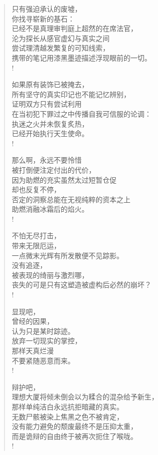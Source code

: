 \documentclass[UTF8, 12pt, a4paper]{ctexrep} %
\begin{document}
\begin{verse}

    只有强迫承认的废墟，\\
    你找寻崭新的基石：\\
    已经不是真理审判庭上超然的在席法官，\\
    沦为探长从感官虚幻与真实之间\\
    尝试理清越发繁复的可知线索，\\
    携带的笔记用漆黑墨迹描述浮现眼前的一切。\\!

    如果原有装饰已被掩去，\\
    所有坚守的真实印记也不能记忆辨别，\\
    证明双方只有尝试利用\\
    在当初犯下罪过之中传播自我可信服的论调：\\
    执迷之火并未恢复炙热，\\
    已经开始执行天生使命。\\!

    那么啊，永远不要怜惜\\
    被打倒便注定付出的代价，\\
    因为助燃的充实虽然太过短暂仓促\\
    却也反复不停，\\
    否定的洞察总能在无视纯粹的资本之上\\
    助燃消融冰霜后的焰火。\\!

    不怕无尽打击，\\
    带来无限厄运，\\
    一点微末光辉有所发散便不见踪影。\\
    没有追逐，\\
    被表现的绮丽与激烈哪，\\
    丧失的可是只有这塑造被虚构后必然的崩坏？\\!

    显现吧，\\
    曾经的因果，\\
    认为只是某时踪迹。\\
    放弃一切现实的掌控，\\
    那样天真烂漫\\
    不要紧随恶意而来。\\!

    辩护吧，\\
    理想大厦将倾未倒会以为糅合的混杂给予新生，\\
    那样单纯洁白永远抗拒暗藏的真实。\\
    无数尸骸被染上焦黑之色不被肯定，\\
    没有能力避免的颓废最终不是压抑太重，\\
    而是诡辩的自由终于被再次扼住了喉咙。\\!


\end{verse}
\end{document}
